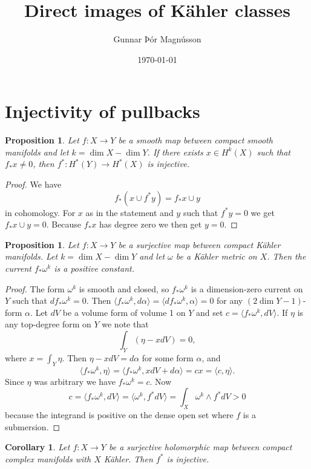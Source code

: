 \documentclass[11pt]{amsart}
\author{Gunnar Þór Magnússon}
\date{\today}
\title{Direct images of K\"ahler classes}
\newtheorem{prop}[theo]{Proposition}
\newtheorem{coro}[theo]{Corollary}
\theoremstyle{definition}
\def\<{\langle}
\def\>{\rangle}
\begin{document}
\maketitle


\section{Injectivity of pullbacks}

\begin{prop}
Let $f : X \to Y$ be a smooth map between compact smooth manifolds and let $k = \dim X - \dim Y$.
If there exists $x \in H^k(X)$ such that $f_* x \not= 0$, then $f^* : H^*(Y) \to H^*(X)$ is injective.
\end{prop}

\begin{proof}
We have
\[
f_*(x \cup f^*y) = f_*x \cup y
\]
in cohomology.
For $x$ as in the statement and $y$ such that $f^*y = 0$ we get $f_* x \cup y = 0$.
Because $f_* x$ has degree zero we then get $y = 0$.
\end{proof}



\begin{prop}
Let $f : X \to Y$ be a surjective map between compact K\"ahler manifolds.
Let $k = \dim X - \dim Y$ and let $\omega$ be a K\"ahler metric on $X$.
Then the current $f_*\omega^{k}$ is a positive constant.
\end{prop}

\begin{proof}
The form $\omega^k$ is smooth and closed, so $f_*\omega^k$ is a dimension-zero current on $Y$ such that $d f_*\omega^k = 0$.
Then $\< f_*\omega^k, d\alpha \> = \< df_*\omega^k, \alpha \> = 0$ for any $(2\dim Y-1)$-form $\alpha$.
Let $dV$ be a volume form of volume 1 on $Y$ and set $c = \< f_*\omega^k ,dV\>$.
If $\eta$ is any top-degree form on $Y$ we note that
\[
\int_Y (\eta - x dV) = 0,
\]
where $x = \int_Y \eta$.
Then $\eta - x dV = d\alpha$ for some form $\alpha$, and
\[
\< f_*\omega^k, \eta \>
= \< f_*\omega^k, x dV + d\alpha \>
= cx
= \< c, \eta \>.
\]
Since $\eta$ was arbitrary we have $f_*\omega^k = c$.
Now
\[
c = \< f_*\omega^k, dV \>
= \< \omega^k, f^*dV \>
= \int_X \omega^k \wedge f^*dV 
> 0
\]
because the integrand is positive on the dense open set where $f$ is a submersion.
\end{proof}

\begin{coro}
Let $f : X \to Y$ be a surjective holomorphic map between compact complex manifolds with $X$ K\"ahler.
Then $f^*$ is injective.
\end{coro}
\end{document}
